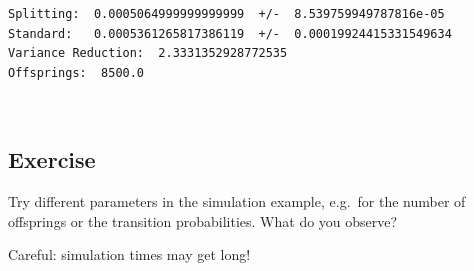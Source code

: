 \documentclass[11pt,a4paper, d]{scrartcl}
\makeatletter
\newcommand{\boxspacing}{\kern\kvtcb@left@rule\kern\kvtcb@boxsep}
\newcommand{\prompt}[4]{
        {\ttfamily\llap{{\color{#2}[#3]:\hspace{3pt}#4}}\vspace{-\baselineskip}}
    }
\makeatother
\begin{document}
    \begin{Verbatim}[commandchars=\\\{\}]
Splitting:  0.0005064999999999999  +/-  8.539759949787816e-05
Standard:   0.0005361265817386119  +/-  0.00019924415331549634
Variance Reduction:  2.3331352928772535
Offsprings:  8500.0
    \end{Verbatim}

    \begin{center}
    \end{center}
    { \hspace*{\fill} \\}
    
    \hypertarget{exercise}{%
\subsection{Exercise}\label{exercise}}

Try different parameters in the simulation example, e.g.~for the number
of offsprings or the transition probabilities. What do you observe?

Careful: simulation times may get long!

    \begin{tcolorbox}[breakable, size=fbox, boxrule=1pt, pad at break*=1mm,colback=cellbackground, colframe=cellborder]
\prompt{In}{incolor}{ }{\boxspacing}
\begin{Verbatim}[commandchars=\\\{\}]

\end{Verbatim}
\end{tcolorbox}


    
    
    
\end{document}
